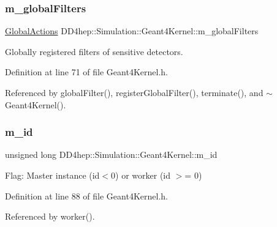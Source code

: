\subsubsection{\texorpdfstring{m\+\_\+global\+Filters}{m\_globalFilters}}
{\footnotesize\ttfamily \hyperlink{class_d_d4hep_1_1_simulation_1_1_geant4_kernel_a9cd070dfd06f049aa11b56688faaa643}{Global\+Actions} D\+D4hep\+::\+Simulation\+::\+Geant4\+Kernel\+::m\+\_\+global\+Filters\hspace{0.3cm}{\ttfamily [protected]}}



Globally registered filters of sensitive detectors. 



Definition at line 71 of file Geant4\+Kernel.\+h.



Referenced by global\+Filter(), register\+Global\+Filter(), terminate(), and $\sim$\+Geant4\+Kernel().

\hypertarget{class_d_d4hep_1_1_simulation_1_1_geant4_kernel_ad9fa311cf783a581dc24b158b754f3bc}{}\label{class_d_d4hep_1_1_simulation_1_1_geant4_kernel_ad9fa311cf783a581dc24b158b754f3bc} 
\subsubsection{\texorpdfstring{m\+\_\+id}{m\_id}}
{\footnotesize\ttfamily unsigned long D\+D4hep\+::\+Simulation\+::\+Geant4\+Kernel\+::m\+\_\+id\hspace{0.3cm}{\ttfamily [protected]}}



Flag\+: Master instance (id$<$0) or worker (id $>$= 0) 



Definition at line 88 of file Geant4\+Kernel.\+h.



Referenced by worker().

\hypertarget{class_d_d4hep_1_1_simulation_1_1_geant4_kernel_ac7d95e62b3a0cb5180bdb3c20bd79a1d}{}\label{class_d_d4hep_1_1_simulation_1_1_geant4_kernel_ac7d95e62b3a0cb5180bdb3c20bd79a1d} 
